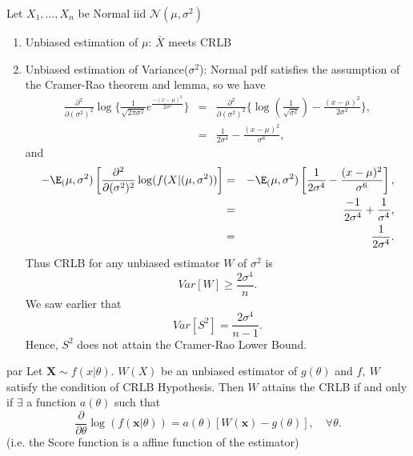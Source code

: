 \documentclass[a4paper,english,12pt]{article}
\newcommand{\bx}{\mathbf{x}}
\newcommand{\bX}{\mathbf{X}}
\begin{document}
\begin{exmp}
\par Let $X_1,\dots,X_n$ be Normal iid $\mathcal{N}(\mu,\sigma^{2})$
\begin{enumerate}
\item Unbiased estimation of $\mu$:
$\bar{X}$ meets CRLB
\item Unbiased estimation of Variance($\sigma^{2}$): Normal pdf satisfies the assumption of the Cramer-Rao theorem and lemma, so we have
\begin{eqnarray*}
\frac{\partial^2}{\partial(\sigma^2)^{2}}\log\{\frac{1}{\sqrt{2\pi\sigma^{2}}}e^{\frac{-(x-\mu)^{2}}{2\sigma^{2}}}\} &=& \frac{\partial^2}{\partial(\sigma^2)^{2}}\{\log(\frac{1}{\sqrt{\sigma^{2}}})-\frac{(x-\mu)^{2}}{2\sigma^{2}}\}, \\ &=&\frac{1}{2\sigma^{4}}-\frac{(x-\mu)^{2}}{\sigma^{6}},
\end{eqnarray*}
and
\begin{eqnarray*}
-\E_(\mu,\sigma^{2})\left[\frac{\partial^2}{\partial(\sigma^2)^{2}}\log(f(X|(\mu,\sigma^{2}))\right] &=& -\E_(\mu,\sigma^{2})\left[\frac{1}{2\sigma^{4}}-\frac{(x-\mu)^{2}}{\sigma^{6}}\right], \\ &=& \frac{-1}{2\sigma^{4}}+\frac{1}{\sigma^{4}}, \\ &=& \frac{1}{2\sigma^{4}}.
\end{eqnarray*}
Thus CRLB for any unbiased estimator $W$ of $\sigma^{2}$ is
\begin{equation}
Var[W] \geq \frac{2\sigma^{4}}{n}.
\end{equation}
We saw earlier that
\begin{equation*}
Var[S^{2}]=\frac{2\sigma^{4}}{n-1}.
\end{equation*}
Hence, $S^2$ does not attain the Cramer-Rao Lower Bound.
\end{enumerate}
\end{exmp}
\begin{cor}
par Let $\bX \sim f(x|\theta)$. $W(X)$ be an unbiased estimator of $g(\theta)$ and $f,~W$ satisfy the condition of CRLB Hypothesis. Then $W$ attains the CRLB if and only if $\exists$ a function $a(\theta)$ such that
\begin{equation}
\frac{\partial}{\partial\theta} \log(f(\bx|\theta)) = a(\theta)[W(\bx)-g(\theta)], \quad \forall \theta.
\end{equation}
(i.e. the Score function is a affine function of the estimator)
\end{cor}
\end{document}
